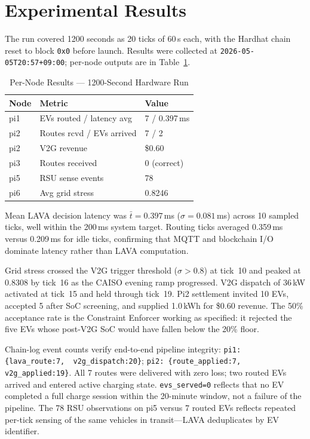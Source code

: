 \documentclass[journal,twoside,twocolumn]{IEEEtran}
\begin{document}
\section{Experimental Results}
\label{sec:exp}

The run covered 1200 seconds as 20 ticks of 60\,s each, with the Hardhat chain
reset to block \texttt{0x0} before launch. Results were collected at
\texttt{2026-05-05T20:57+09:00}; per-node outputs are in Table~\ref{tab:results}.

\begin{table}[!t]
\caption{Per-Node Results --- 1200-Second Hardware Run}
\label{tab:results}
\centering
\footnotesize
\renewcommand{\arraystretch}{1.15}
\begin{tabular}{@{}lll@{}}
\toprule
\textbf{Node} & \textbf{Metric} & \textbf{Value} \\
\midrule
pi1 & EVs routed / latency avg & 7 / 0.397\,ms \\
pi2 & Routes rcvd / EVs arrived & 7 / 2 \\
pi2 & V2G revenue & \$0.60 \\
pi3 & Routes received & 0 (correct) \\
pi5 & RSU sense events & 78 \\
pi6 & Avg grid stress & 0.8246 \\
\bottomrule
\end{tabular}
\end{table}

Mean LAVA decision latency was $\bar{t} = 0.397$\,ms ($\sigma = 0.081$\,ms)
across 10 sampled ticks, well within the 200\,ms system target. Routing ticks
averaged 0.359\,ms versus 0.209\,ms for idle ticks, confirming that MQTT and
blockchain I/O dominate latency rather than LAVA computation.

Grid stress crossed the V2G trigger threshold ($\sigma > 0.8$) at tick~10 and
peaked at 0.8308 by tick~16 as the CAISO evening ramp progressed. V2G dispatch
of 36\,kW activated at tick~15 and held through tick~19. Pi2 settlement invited
10 EVs, accepted 5 after SoC screening, and supplied 1.0\,kWh for \$0.60
revenue. The 50\% acceptance rate is the Constraint Enforcer working as
specified: it rejected the five EVs whose post-V2G SoC would have fallen below
the 20\% floor.

Chain-log event counts verify end-to-end pipeline integrity:
\texttt{pi1: \{lava\_route:7,\, v2g\_dispatch:20\}};
\texttt{pi2: \{route\_applied:7,\, v2g\_applied:19\}}.
All 7 routes were delivered with zero loss; two routed EVs arrived and entered
active charging state. \texttt{evs\_served=0} reflects that no EV completed a
full charge session within the 20-minute window, not a failure of the pipeline.
The 78 RSU observations on pi5 versus 7 routed EVs reflects repeated per-tick
sensing of the same vehicles in transit---LAVA deduplicates by EV identifier.
\end{document}
